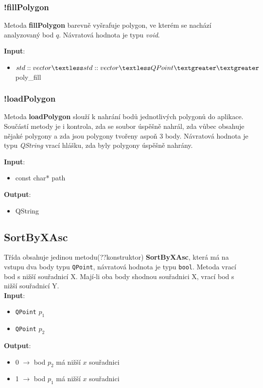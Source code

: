 \documentclass[a4paper, 12pt]{article}
\begin{document}
\subsubsection{!fillPolygon}
Metoda \textbf{fillPolygon} barevně vyšrafuje polygon, ve kterém se nachází analyzovaný bod $q$. Návratová hodnota je typu \textit{void}.

\textbf{Input}:
\begin{itemize}
\item $std::vector\textless std::vector\textless QPoint\textgreater \textgreater$ poly\_fill
\end{itemize}

\subsubsection{!loadPolygon}
Metoda \textbf{loadPolygon} slouží k nahrání bodů jednotlivých polygonů do aplikace. Součástí metody je i kontrola, zda se soubor úspěšně nahrál, zda vůbec obsahuje nějaké polygony a zda jsou polygony tvořeny aspoň 3 body. Návratová hodnota je typu \textit{QString} vrací hlášku, zda byly polygony úspěšně nahrány.

\textbf{Input}:
\begin{itemize}
\item const char* path
\end{itemize}

\textbf{Output}:
\begin{itemize}
\item QString
\end{itemize}

\subsection{SortByXAsc}
Třída obsahuje jedinou metodu(??konstruktor) \textbf{SortByXAsc}, která má na vstupu dva body typu \texttt{QPoint}, návratová hodnota je typu \texttt{bool}. Metoda vrací bod s nižší  souřadnicí X. Mají-li oba body shodnou souřadnici X, vrací bod s nižší souřadnicí Y.\\

\textbf{Input}:
\begin{itemize}
\item \texttt{QPoint} $p_1$
\item \texttt{QPoint} $p_2$
\end{itemize}

\textbf{Output}:
\begin{itemize}
\item 0 $\rightarrow$ bod $p_2$ má nižší $x$ souřadnici
\item 1 $\rightarrow$ bod $p_1$ má nižší $x$ souřadnici
\end{itemize}
\end{document}
